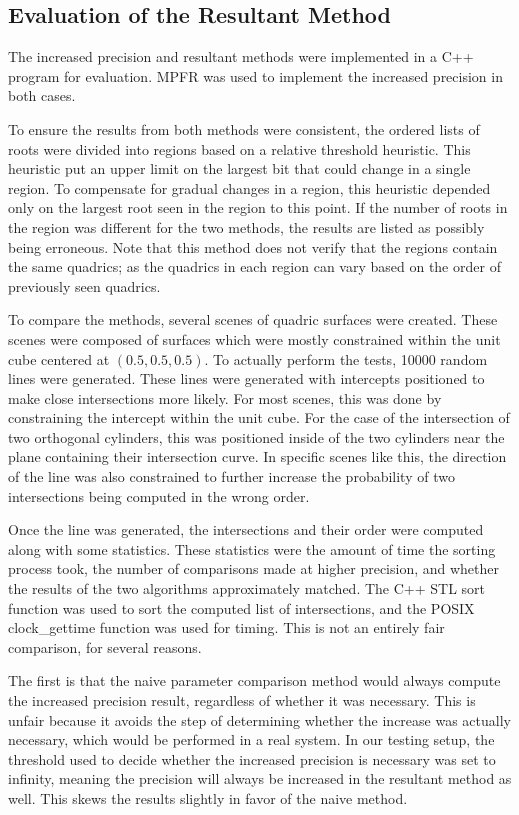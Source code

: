 \documentclass{cccg16}
\begin{document}
\subsection{Evaluation of the Resultant Method}
The increased precision and resultant methods were implemented in a
C++ program for evaluation.  MPFR was used to implement the increased
precision in both cases.

To ensure the results from both methods were consistent, the ordered
lists of roots were divided into regions based on a relative threshold
heuristic.  This heuristic put an upper limit on the largest bit that
could change in a single region.  To compensate for gradual changes in
a region, this heuristic depended only on the largest root seen in the
region to this point.  If the number of roots in the region was
different for the two methods, the results are listed as possibly
being erroneous.  Note that this method does not verify that the
regions contain the same quadrics; as the quadrics in each region can
vary based on the order of previously seen quadrics.

To compare the methods, several scenes of quadric surfaces were
created.  These scenes were composed of surfaces which were mostly
constrained within the unit cube centered at $(0.5, 0.5, 0.5)$.  To
actually perform the tests, 10000 random lines were generated.  These
lines were generated with intercepts positioned to make close
intersections more likely.  For most scenes, this was done by
constraining the intercept within the unit cube.  For the case of the
intersection of two orthogonal cylinders, this was positioned inside
of the two cylinders near the plane containing their intersection
curve.  In specific scenes like this, the direction of the line was
also constrained to further increase the probability of two
intersections being computed in the wrong order.

Once the line was generated, the intersections and their order were
computed along with some statistics.  These statistics were the amount
of time the sorting process took, the number of comparisons made at
higher precision, and whether the results of the two algorithms
approximately matched.  The C++ STL sort function was used to sort the
computed list of intersections, and the POSIX clock\_gettime function
was used for timing.  This is not an entirely fair comparison, for
several reasons.

The first is that the naive parameter comparison method would always
compute the increased precision result, regardless of whether it was
necessary.  This is unfair because it avoids the step of determining
whether the increase was actually necessary, which would be performed
in a real system.  In our testing setup, the threshold used to decide
whether the increased precision is necessary was set to infinity,
meaning the precision will always be increased in the resultant method
as well.  This skews the results slightly in favor of the naive
method.
\end{document}
